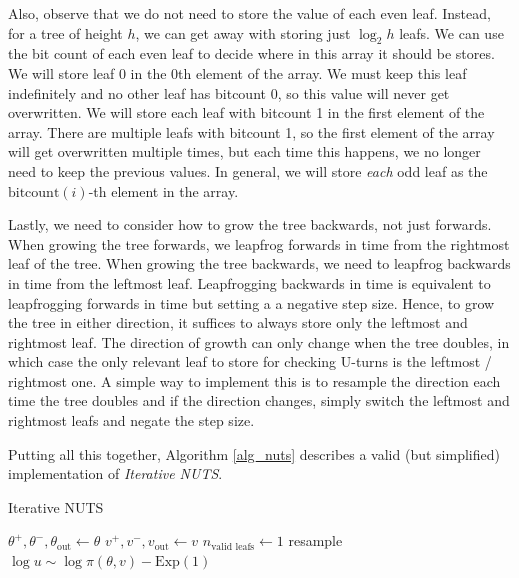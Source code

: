 \documentclass[12pt]{article}
\begin{document}
{Also, observe that we do not need to store the value of each even leaf. Instead, for a tree of height $h$, we can get away with storing just $\log_2 h$ leafs. We can use the bit count of each even leaf to decide where in this array it should be stores. We will store leaf 0 in the 0th element of the array. We must keep this leaf indefinitely and no other leaf has bitcount 0, so this value will never get overwritten. We will store each leaf with bitcount 1 in the first element of the array. There are multiple leafs with bitcount 1, so the first element of the array will get overwritten multiple times, but each time this happens, we no longer need to keep the previous values. In general, we will store \textit{each} odd leaf as the $\text{bitcount}(i)$-th element in the array.

Lastly, we need to consider how to grow the tree backwards, not just forwards. When growing the tree forwards, we leapfrog forwards in time from the rightmost leaf of the tree. When growing the tree backwards, we need to leapfrog backwards in time from the leftmost leaf. Leapfrogging backwards in time is equivalent to leapfrogging forwards in time but setting a a negative step size. Hence, to grow the tree in either direction, it suffices to always store only the leftmost and rightmost leaf. The direction of growth can only change when the tree doubles, in which case the only relevant leaf to store for checking U-turns is the leftmost / rightmost one. A simple way to implement this is to resample the direction each time the tree doubles and if the direction changes, simply switch the leftmost and rightmost leafs and negate the step size.

Putting all this together, Algorithm \ref{alg_nuts} describes a valid (but simplified) implementation of \textit{Iterative NUTS}.

\newpage
{}
\begin{algorithm}
\small
\caption{Iterative NUTS}
\label{alg_nuts}
\begin{algorithmic}
 
	\State $\theta^+, \theta^-, \theta_\textrm{out} \gets \theta $ 
	\State $v^+, v^-, v_\textrm{out} \gets v $
	\State $n_\textrm{valid leafs} \gets 1$ 
	\State resample $\log u \sim \log \pi(\theta, v) - \textrm{Exp}(1)$ 
	

\end{algorithmic}
\end{algorithm}}
\end{document}
